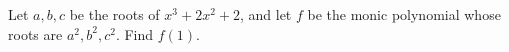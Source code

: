 Let $a,b,c$ be the roots of $x^3+2x^2+2$, and let $f$ be the monic polynomial whose roots are $a^2,b^2,c^2$. Find $f(1)$.
